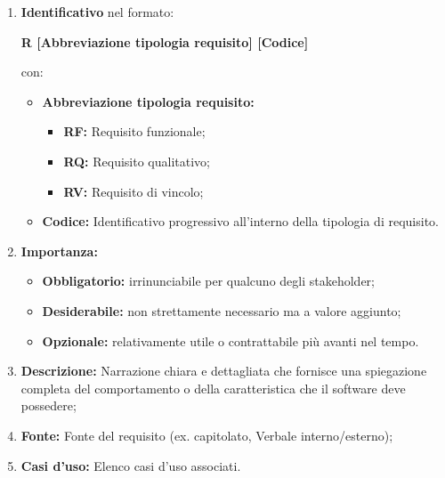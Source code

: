 \begin{enumerate}
    \item \textbf{Identificativo} nel formato:\\
          \begin{center}
              \textbf{R [Abbreviazione tipologia requisito] [Codice]}
          \end{center}
          con:
          \begin{itemize}
              \item \textbf{Abbreviazione tipologia requisito:}
                    \begin{itemize}
                        \item \textbf{RF:} Requisito funzionale;
                        \item \textbf{RQ:} Requisito qualitativo;
                        \item \textbf{RV:} Requisito di vincolo;
                    \end{itemize}
              \item \textbf{Codice:} Identificativo progressivo all'interno della tipologia di requisito.
          \end{itemize}
    \item \textbf{Importanza:}
          \begin{itemize}
              \item \textbf{Obbligatorio:} irrinunciabile per qualcuno degli stakeholder;
              \item \textbf{Desiderabile:} non strettamente necessario ma a valore aggiunto;
              \item \textbf{Opzionale:} relativamente utile o contrattabile più avanti nel tempo.
          \end{itemize}
    \item \textbf{Descrizione:} Narrazione chiara e dettagliata che fornisce una spiegazione completa del comportamento o della caratteristica che il software deve possedere;
    \item \textbf{Fonte:} Fonte del requisito (ex. capitolato, Verbale interno/esterno);
    \item \textbf{Casi d'uso:} Elenco casi d'uso associati.
\end{enumerate}
